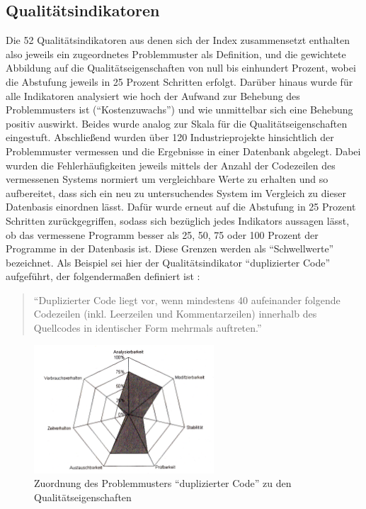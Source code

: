 \documentclass[da,ngerman]{stthesis}
\begin{document}
			\subsection{Qualitätsindikatoren}
				Die 52 Qualitätsindikatoren aus denen sich der Index zusammensetzt enthalten also jeweils ein zugeordnetes Problemmuster als Definition, und die gewichtete Abbildung auf die Qualitätseigenschaften von null bis einhundert Prozent, wobei die Abstufung jeweils in 25 Prozent Schritten erfolgt. Darüber hinaus wurde für alle Indikatoren analysiert wie hoch der Aufwand zur Behebung des Problemmusters ist ("`Kostenzuwachs"') und wie unmittelbar sich eine Behebung positiv auswirkt. Beides wurde analog zur Skala für die Qualitätseigenschaften eingestuft. Abschließend wurden über 120 Industrieprojekte hinsichtlich der Problemmuster vermessen und die Ergebnisse in einer Datenbank abgelegt. Dabei wurden die Fehlerhäufigkeiten jeweils mittels der Anzahl der Codezeilen des vermessenen Systems normiert um vergleichbare Werte zu erhalten und so aufbereitet, dass sich ein neu zu untersuchendes System im Vergleich zu dieser Datenbasis einordnen lässt. Dafür wurde erneut auf die Abstufung in 25 Prozent Schritten zurückgegriffen, sodass sich bezüglich jedes Indikators aussagen lässt, ob das vermessene Programm besser als 25, 50, 75 oder 100 Prozent der Programme in der Datenbasis ist. Diese Grenzen werden als "`Schwellwerte"' bezeichnet. \newline
			Als Beispiel sei hier der Qualitätsindikator "`duplizierter Code"' aufgeführt, der folgendermaßen definiert ist \cite{CodeQualityManagement}:
				\begin{quote}
  					"`Duplizierter Code liegt vor, wenn mindestens 40 aufeinander folgende Codezeilen (inkl. Leerzeilen und Kommentarzeilen) innerhalb des Quellcodes in identischer Form mehrmals auftreten."'
  				\end{quote}
  				\begin{figure} [h]
					\centering
					\includegraphics [width=0.6\textwidth] {indexeigenschaften.png}
					\caption{Zuordnung des Problemmusters "`duplizierter Code"' zu den Qualitätseigenschaften \cite{CodeQualityManagement}}
					\label{indexeigen}
				\end{figure}
\end{document}
